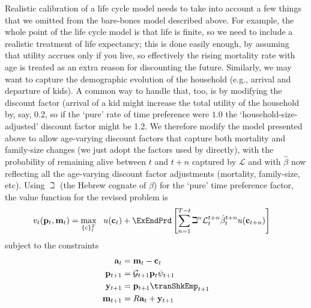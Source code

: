 \documentclass[titlepage, headings=optiontotocandhead]{econtex}
\begin{document}
Realistic calibration of a life cycle model needs to take into account a few things that we omitted from the bare-bones model described above. For example, the whole point of the life cycle model is that life is finite, so we need to include a realistic treatment of life expectancy; this is done easily enough, by assuming that utility accrues only if you live, so effectively the rising mortality rate with age is treated as an extra reason for discounting the future.  Similarly, we may want to capture the demographic evolution of the household (e.g., arrival and departure of kids).  A common way to handle that, too, is by modifying the discount factor (arrival of a kid might increase the total utility of the household by, say, 0.2, so if the `pure' rate of time preference were $1.0$ the `household-size-adjusted' discount factor might be 1.2.  We therefore modify the model presented above to allow age-varying discount factors that capture both mortality and family-size changes (we just adopt the factors used by \cite{cagettiWprofiles} directly), with the probability of remaining alive between $t$ and $t+n$ captured by $\mathcal{L}$ and with $\hat{\beta}$ now reflecting all the age-varying discount factor adjustments (mortality, family-size, etc).  Using $\beth$ (the Hebrew cognate of $\beta$) for the `pure' time preference factor, the value function for the revised problem is
  \begin{equation}\begin{gathered}\begin{aligned}
        v_{t}(\mathbf{p}_{t},\mathbf{m}_{t}) & =    \max_{\{\mathrm{c}\}_{t}^{T}}~~ u(\mathbf{c}_{t})+\ExEndPrd\left[\sum_{n=1}^{T-t}\beth^{n} \mathcal{L}_{t}^{t+n}\hat{\beta}_{t}^{t+n} u(\mathbf{c}_{t+n}) \right]   \label{eq:lifecyclemax}
      \end{aligned}\end{gathered}  \end{equation}
subject to the constraints
  \begin{equation*}\begin{gathered}\begin{aligned}
        \mathbf{a}_{t}  & = \mathbf{m}_{t}-\mathbf{c}_{t}
        \\      \mathbf{p}_{t+1}  & = \mathcal{G}_{t+1}\mathbf{p}_{t}\psi_{t+1}
        \\      \mathbf{y}_{t+1}  & = \mathbf{p}_{t+1}\tranShkEmp _{t+1}
        \\      \mathbf{m}_{t+1}  & = R \mathbf{a}_{t}+\mathbf{y}_{t+1}
      \end{aligned}\end{gathered}\end{equation*}
\end{document}
